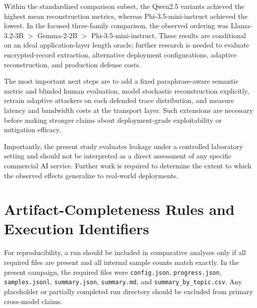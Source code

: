 \documentclass[journal,article,submit,pdftex,moreauthors]{Definitions/mdpi}
\begin{document}
Within the standardized comparison subset, the Qwen2.5 variants achieved the highest mean reconstruction metrics, whereas Phi-3.5-mini-instruct achieved the lowest. In the focused three-family comparison, the observed ordering was Llama-3.2-3B $>$ Gemma-2-2B $>$ Phi-3.5-mini-instruct. These results are conditional on an ideal application-layer length oracle; further research is needed to evaluate encrypted-record extraction, alternative deployment configurations, adaptive reconstruction, and production defense costs.

The most important next steps are to add a fixed paraphrase-aware semantic metric and blinded human evaluation, model stochastic reconstruction explicitly, retrain adaptive attackers on each defended trace distribution, and measure latency and bandwidth costs at the transport layer. Such extensions are necessary before making stronger claims about deployment-grade exploitability or mitigation efficacy.

Importantly, the present study evaluates leakage under a controlled laboratory setting and should not be interpreted as a direct assessment of any specific commercial AI service. Further work is required to determine the extent to which the observed effects generalize to real-world deployments.

\appendixstart

\appendix
\section{Artifact-Completeness Rules and Execution Identifiers}\label{app:runs}
For reproducibility, a run should be included in comparative analyses only if all required files are present and all internal sample counts match exactly. In the present campaign, the required files were \texttt{config.json}, \texttt{progress.json}, \texttt{samples.jsonl}, \texttt{summary.json}, \texttt{summary.md}, and \texttt{summary\_by\_topic.csv}. Any placeholder or partially completed run directory should be excluded from primary cross-model claims.
\end{document}

